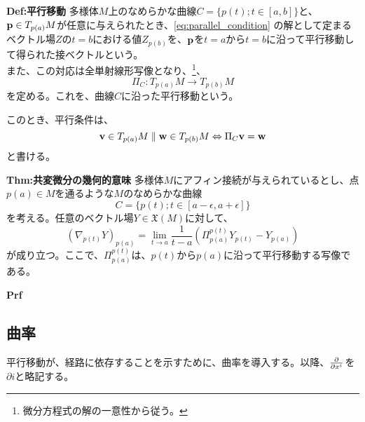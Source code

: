 \documentclass[a4paper,11pt]{jsarticle}
\numberwithin{equation}{section}
\begin{document}
\begin{itembox}[l]{\textbf{Def:平行移動}}
    多様体$M$上のなめらかな曲線$C = \{p(t) ; t \in [a,b]\}$と、$\vb{p} \in T_{p(a)}M$が任意に与えられたとき、\ref{eq:parallel_condition}
    の解として定まるベクトル場$Z$の$t=b$における値$Z_{p(b)}$を、$\vb{p}$を$t=a$から$t=b$に沿って平行移動して得られた接ベクトルという。\\
    また、この対応は全単射線形写像となり、\footnote{微分方程式の解の一意性から従う。}、
    \begin{equation}
        \label{eq:parallel_transport}
        \Pi_C : T_{p(a)}M \to T_{p(b)}M
    \end{equation}
    を定める。これを、曲線$C$に沿った平行移動という。
\end{itembox}
このとき、平行条件は、
\begin{equation}
    \vb{v} \in T_{p(a)}M \parallel \vb{w} \in T_{p(b)}M \Leftrightarrow \Pi_C \vb{v} = \vb{w}
\end{equation}
と書ける。\\

\begin{itembox}[l]{\textbf{Thm:共変微分の幾何的意味}}
    多様体$M$にアフィン接続が与えられているとし、点$p(a)\in M$を通るような$M$のなめらかな曲線
    \begin{equation}
        C = \{p(t) ; t \in [a-\epsilon,a+\epsilon]\}
    \end{equation}
    を考える。任意のベクトル場$Y \in \mathfrak{X}(M)$に対して、
    \begin{equation}
        (\nabla_{\dot{p}(t)} Y)_{p(a)} = \underset{t \to a}{\lim} \frac{1}{t-a}(\Pi_{p(a)}^{p(t)}Y_{p(t)} - Y_{p(a)})
    \end{equation}
    が成り立つ。ここで、$\Pi_{p(a)}^{p(t)}$は、$p(t)$から$p(a)$に沿って平行移動する写像である。
\end{itembox}
\textbf{Prf}\\

\subsection{曲率}
平行移動が、経路に依存することを示すために、曲率を導入する。以降、$\pdv{x^i}$を$\partial{i}$と略記する。
\end{document}
